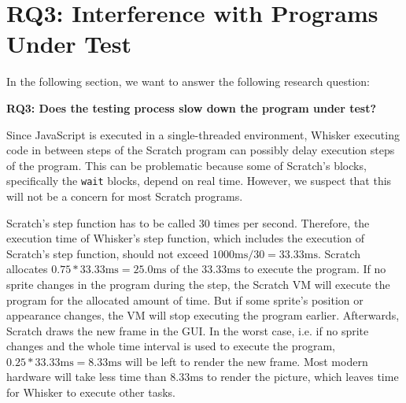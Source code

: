 %
%

\section{RQ3: Interference with Programs Under Test}
\label{sec:rq3}

In the following section, we want to answer the following research question:

\begin{center}\begin{minipage}{.9\textwidth}
    \textbf{RQ3: Does the testing process slow down the program under test?}
\end{minipage}\end{center}

\noindent Since JavaScript is executed in a single-threaded environment,
Whisker executing code in between steps of the Scratch program can possibly delay execution steps of the program.
This can be problematic because some of Scratch's blocks,
specifically the \texttt{wait} blocks, depend on real time.
However, we suspect that this will not be a concern for most Scratch programs.
\parspace

Scratch's step function has to be called 30 times per second.
Therefore, the execution time of Whisker's step function, which includes the execution of Scratch's step function,
should not exceed $1000\text{ms}/30 = 33.33\text{ms}$.
Scratch allocates $0.75 * 33.33\text{ms} = 25.0\text{ms}$ of the $33.33\text{ms}$ to execute the program.
If no sprite changes in the program during the step,
the Scratch VM will execute the program for the allocated amount of time.
But if some sprite's position or appearance changes, the VM will stop executing the program earlier.
Afterwards, Scratch draws the new frame in the GUI.
In the worst case, i.e. if no sprite changes and the whole time interval is used to execute the program,
$0.25 * 33.33\text{ms} = 8.33\text{ms}$ will be left to render the new frame.
Most modern hardware will take less time than $8.33\text{ms}$ to render the picture,
which leaves time for Whisker to execute other tasks.
\parspace

